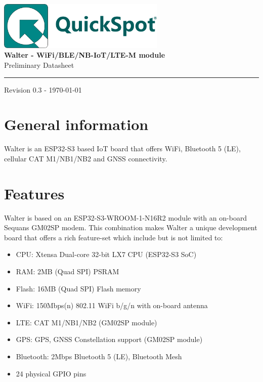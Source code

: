 \documentclass[11pt]{article}
\newcommand{\dptproduct}{Walter - WiFi/BLE/NB-IoT/LTE-M module}
\begin{document}
\begin{titlepage}
\hfill\includegraphics[width=8cm]{logo.pdf}\\

\hfill {\bf \Large  \dptproduct}\\[-3mm]

\hfill {\Large Preliminary Datasheet}

\vfill
\rule{487pt}{1pt}

\hfill Revision 0.3 - \today
\end{titlepage}
\section{General information}
Walter is an ESP32-S3 based IoT board that offers WiFi, Bluetooth 5 (LE), cellular CAT M1/NB1/NB2 and GNSS connectivity. 

\section{Features}
Walter is based on an ESP32-S3-WROOM-1-N16R2 module with an on-board Sequans GM02SP modem.
This combination makes Walter a unique development board that offers a rich feature-set which include but is not limited to:
\begin{itemize}
	\item CPU: Xtensa Dual-core 32-bit LX7 CPU (ESP32-S3 SoC)
	\item RAM: 2MB (Quad SPI) PSRAM
	\item Flash: 16MB (Quad SPI) Flash memory
	\item WiFi: 150Mbps(n) 802.11 WiFi b/g/n with on-board antenna
	\item LTE: CAT M1/NB1/NB2 (GM02SP module)
	\item GPS: GPS, GNSS Constellation support (GM02SP module)
	\item Bluetooth: 2Mbps Bluetooth 5 (LE), Bluetooth Mesh
	\item 24 physical GPIO pins 
\end{itemize}
\end{document}

